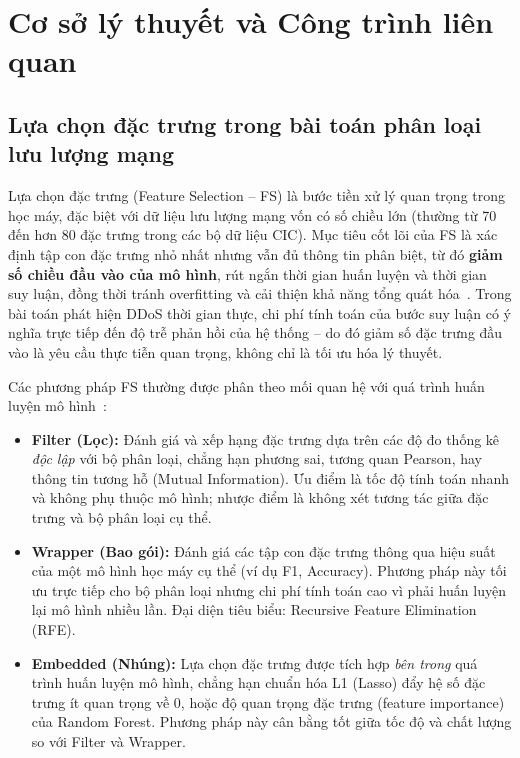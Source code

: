\section{Cơ sở lý thuyết và Công trình liên quan}
\label{sec:cong-trinh-lien-quan}

\subsection{Lựa chọn đặc trưng trong bài toán phân loại lưu lượng mạng}

Lựa chọn đặc trưng (Feature Selection -- FS) là bước tiền xử lý quan trọng trong học máy, đặc biệt với dữ liệu lưu lượng mạng vốn có số chiều lớn (thường từ 70 đến hơn 80 đặc trưng trong các bộ dữ liệu CIC). Mục tiêu cốt lõi của FS là xác định tập con đặc trưng nhỏ nhất nhưng vẫn đủ thông tin phân biệt, từ đó \textbf{giảm số chiều đầu vào của mô hình}, rút ngắn thời gian huấn luyện và thời gian suy luận, đồng thời tránh overfitting và cải thiện khả năng tổng quát hóa~\cite{ma2023fams}. Trong bài toán phát hiện DDoS thời gian thực, chi phí tính toán của bước suy luận có ý nghĩa trực tiếp đến độ trễ phản hồi của hệ thống -- do đó giảm số đặc trưng đầu vào là yêu cầu thực tiễn quan trọng, không chỉ là tối ưu hóa lý thuyết.

Các phương pháp FS thường được phân theo mối quan hệ với quá trình huấn luyện mô hình~\cite{ma2023fams}:

\begin{itemize}
    \item \textbf{Filter (Lọc):} Đánh giá và xếp hạng đặc trưng dựa trên các độ đo thống kê \textit{độc lập} với bộ phân loại, chẳng hạn phương sai, tương quan Pearson, hay thông tin tương hỗ (Mutual Information). Ưu điểm là tốc độ tính toán nhanh và không phụ thuộc mô hình; nhược điểm là không xét tương tác giữa đặc trưng và bộ phân loại cụ thể.

    \item \textbf{Wrapper (Bao gói):} Đánh giá các tập con đặc trưng thông qua hiệu suất của một mô hình học máy cụ thể (ví dụ F1, Accuracy). Phương pháp này tối ưu trực tiếp cho bộ phân loại nhưng chi phí tính toán cao vì phải huấn luyện lại mô hình nhiều lần. Đại diện tiêu biểu: Recursive Feature Elimination (RFE).

    \item \textbf{Embedded (Nhúng):} Lựa chọn đặc trưng được tích hợp \textit{bên trong} quá trình huấn luyện mô hình, chẳng hạn chuẩn hóa L1 (Lasso) đẩy hệ số đặc trưng ít quan trọng về 0, hoặc độ quan trọng đặc trưng (feature importance) của Random Forest. Phương pháp này cân bằng tốt giữa tốc độ và chất lượng so với Filter và Wrapper.
\end{itemize}

